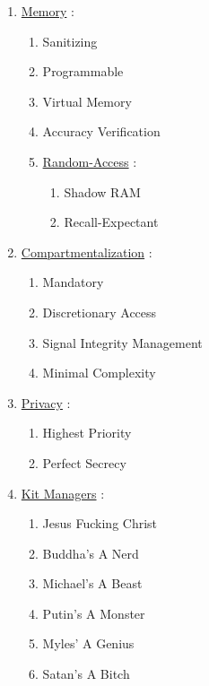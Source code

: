 \documentclass[11pt]{article}
\begin{document}
\begin{enumerate}
	\item[] \ul{Memory} :
	\begin{enumerate}
		\item[] Sanitizing
		\item[] Programmable
		\item[] Virtual Memory
		\item[] Accuracy Verification
	
		\item[] \ul{Random-Access} :
		\begin{enumerate}
			\item[] Shadow RAM
			\item[] Recall-Expectant
		\end{enumerate}
	\end{enumerate}

	\item[] \ul{Compartmentalization} :
	\begin{enumerate}
		\item[] Mandatory
		\item[] Discretionary Access
		\item[] Signal Integrity Management
		\item[] Minimal Complexity
	\end{enumerate}

	\item[] \ul{Privacy} :
	\begin{enumerate}
		\item[] Highest Priority
		\item[] Perfect Secrecy
	\end{enumerate}

	\item[] \ul{Kit Managers} :
	\begin{enumerate}
		\item[] Jesus Fucking Christ
		\item[] Buddha's A Nerd
		\item[] Michael's A Beast
		\item[] Putin's A Monster
		\item[] Myles' A Genius
		\item[] Satan's A Bitch
	\end{enumerate}

\end{enumerate}
\end{document}
